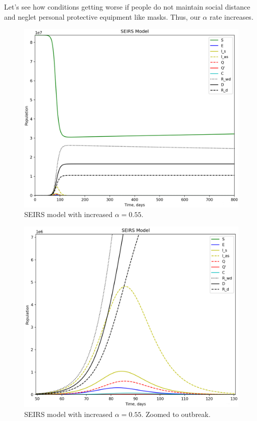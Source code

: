\documentclass[12pt, a4paper]{article}
\begin{document}
	Let's see how conditions getting worse if people do not maintain social distance and neglet personal protective equipment like masks. Thus, our $\alpha$ rate increases.

	\begin{figure}[h!]
		\centering
		\includegraphics[width=12cm]{seirs_bigalpha.png}
		\caption{SEIRS model with increased $\alpha = 0.55$.}
	\end{figure}

	\begin{figure}[h!]
		\centering
		\includegraphics[width=12cm]{seirs_bigalpha_2.png}
		\caption{SEIRS model with increased $\alpha = 0.55$. Zoomed to outbreak.}
	\end{figure}
\end{document}
